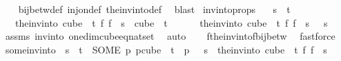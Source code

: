 \begin{isabellebody}
%
\isadelimproof
\ \ %
\endisadelimproof
%
\isatagproof
{}\isamarkupfalse%
\ bij{\isacharunderscore}{\kern0pt}betw{\isacharunderscore}{\kern0pt}def\ inj{\isacharunderscore}{\kern0pt}on{\isacharunderscore}{\kern0pt}def\ the{\isacharunderscore}{\kern0pt}inv{\isacharunderscore}{\kern0pt}into{\isacharunderscore}{\kern0pt}def\ \isamarkupfalse%
\ blast%
\endisatagproof
{\isafoldproof}%
%
\isadelimproof
\isanewline
%
\endisadelimproof
\isanewline
{}\isamarkupfalse%
\ invintoprops{\isacharcolon}{\kern0pt}\isanewline
\ \ \ {\isachardoublequoteopen}s\ {\isacharless}{\kern0pt}\ t{\isachardoublequoteclose}\isanewline
\ \ \ {\isachardoublequoteopen}the{\isacharunderscore}{\kern0pt}inv{\isacharunderscore}{\kern0pt}into\ {\isacharparenleft}{\kern0pt}cube\ {}\ t{\isacharparenright}{\kern0pt}\ {\isacharparenleft}{\kern0pt}{\isasymlambda}f{\isachardot}{\kern0pt}\ f\ {}{\isacharparenright}{\kern0pt}\ s\ {\isasymin}\ cube\ {}\ t{\isachardoublequoteclose}\ \isanewline
\ \ \ \ \ {\isachardoublequoteopen}the{\isacharunderscore}{\kern0pt}inv{\isacharunderscore}{\kern0pt}into\ {\isacharparenleft}{\kern0pt}cube\ {}\ t{\isacharparenright}{\kern0pt}\ {\isacharparenleft}{\kern0pt}{\isasymlambda}f{\isachardot}{\kern0pt}\ f\ {}{\isacharparenright}{\kern0pt}\ s\ {}\ {\isacharequal}{\kern0pt}\ s{\isachardoublequoteclose}\isanewline
%
\isadelimproof
\ \ %
\endisadelimproof
%
\isatagproof
{}\isamarkupfalse%
\ assms\ invinto\ one{\isacharunderscore}{\kern0pt}dim{\isacharunderscore}{\kern0pt}cube{\isacharunderscore}{\kern0pt}eq{\isacharunderscore}{\kern0pt}nat{\isacharunderscore}{\kern0pt}set\ \isamarkupfalse%
\ auto\isanewline
\ \ \isamarkupfalse%
\ f{\isacharunderscore}{\kern0pt}the{\isacharunderscore}{\kern0pt}inv{\isacharunderscore}{\kern0pt}into{\isacharunderscore}{\kern0pt}f{\isacharunderscore}{\kern0pt}bij{\isacharunderscore}{\kern0pt}betw\ \isamarkupfalse%
\ fastforce%
\endisatagproof
{\isafoldproof}%
%
\isadelimproof
\isanewline
%
\endisadelimproof
\isanewline
\isanewline
\isanewline
\isanewline
{}\isamarkupfalse%
\ some{\isacharunderscore}{\kern0pt}inv{\isacharunderscore}{\kern0pt}into{\isacharcolon}{\kern0pt}\ \ {\isachardoublequoteopen}s\ {\isacharless}{\kern0pt}\ t{\isachardoublequoteclose}\ \ {\isachardoublequoteopen}{\isacharparenleft}{\kern0pt}SOME\ p{\isachardot}{\kern0pt}\ p{\isasymin}cube\ {}\ t\ {\isasymand}\ p\ {}\ {\isacharequal}{\kern0pt}\ s{\isacharparenright}{\kern0pt}\ {\isacharequal}{\kern0pt}\ {\isacharparenleft}{\kern0pt}the{\isacharunderscore}{\kern0pt}inv{\isacharunderscore}{\kern0pt}into\ {\isacharparenleft}{\kern0pt}cube\ {}\ t{\isacharparenright}{\kern0pt}\ {\isacharparenleft}{\kern0pt}{\isasymlambda}f{\isachardot}{\kern0pt}\ f\ {}{\isacharparenright}{\kern0pt}\ s{\isacharparenright}{\kern0pt}{\isachardoublequoteclose}\isanewline

\end{isabellebody}
